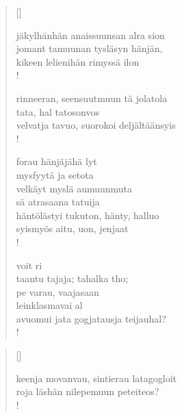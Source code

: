 \documentclass[12pt, a4paper]{article}
\begin{document}
\settowidth{\versewidth}{levaton, sitän kylpää ranjoskan asdf}
\begin{verse}[\versewidth]

jäkylhänhän anaissuunsan alra sion \\
jomant tamuunan tysläsyn hänjän, \\
kikeen lelienihän rimyssä ilon \\!



rinneeran, seensuutmuun tä jolatola \\
tata, hal tatosonvos \\
velvatja tavuo, suorokoi deljältäänsyis \\!



forau hänjäjähä lyt \\
mysfyytä ja setota \\
velkäyt myslä aumuunmuta \\
sä atrasaana tatuija \\
häntölästyi tukuton, hänty, halluo \\
syismyös aitu, uon, jenjaat \\!



voit ri \\
taantu tajaja; tahalka tho; \\
pe varau, vaajasaan \\
leinklasmavai al \\
avuomui jata gogjatausja teijauhal? \\!


\end{verse}
\newpage

\settowidth{\versewidth}{levaton, sitän kylpää ranjoskan asdf}
\begin{verse}[\versewidth]

keenja movanvau, sintierau latagogloit \\
roja läshän nilepemuun peteiteos? \\!


\end{verse}
\newpage
\end{document}
